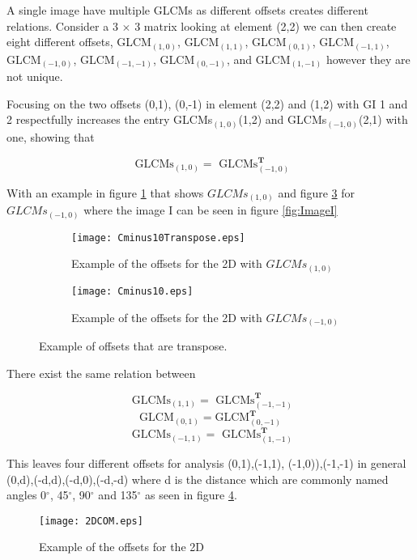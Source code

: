 A single image have multiple GLCMs as different offsets creates different relations. Consider a 3 $\times$ 3 matrix looking at element (2,2) we can then create eight different offsets, GLCM$_{(1,0)}$, GLCM$_{(1,1)}$, GLCM$_{(0,1)}$, GLCM$_{(-1,1)}$, GLCM$_{(-1,0)}$, GLCM$_{(-1,-1)}$, GLCM$_{(0,-1)}$, and GLCM$_{(1,-1)}$ however they are not unique. 

Focusing on the two offsets {(0,1), (0,-1)} in element (2,2) and (1,2) with GI 1 and 2 respectfully increases the entry GLCMs$_{(1,0)}$(1,2) and GLCMs$_{(-1,0)}$(2,1) with one, showing that 

\[
\text{ GLCMs}_{(1,0)}=\text{ GLCMs}_{(-1,0)}^\textbf{T}
\]

With an example in figure \ref{fig:Cminus10Transpose} that shows $GLCMs_{(1,0)}$ and figure \ref{fig:Cminus10Example} for $GLCMs_{(-1,0)}$ where the image I can be seen in figure \ref{fig:ImageI}

\begin{figure}[H]
\centering
    \begin{subfigure}{.45\textwidth}
      \centering
      \texttt{[image: Cminus10Transpose.eps]}
      \caption{Example of the offsets for the 2D with $GLCMs_{(1,0)}$}\label{fig:Cminus10Transpose}
    \end{subfigure}
    \begin{subfigure}{.45\textwidth}
      \centering
      \texttt{[image: Cminus10.eps]}
      \caption{Example of the offsets for the 2D with $GLCMs_{(-1,0)}$}\label{fig:Cminus10Example}
    \end{subfigure}
    \caption{Example of offsets that are transpose.}
\end{figure}

There exist the same relation between

\[
\text{ GLCMs}_{(1,1)}=\text{ GLCMs}_{(-1,-1)}^\textbf{T}
\]
\[
\text{GLCM}_{(0,1)} = \text{GLCM}_{(0,-1)}^\textbf{T}
\]
\[
\text{ GLCMs}_{(-1,1)}=\text{ GLCMs}_{(1,-1)}^\textbf{T}
\]


This leaves four different offsets for analysis {(0,1),(-1,1), (-1,0)),(-1,-1)} in general {(0,d),(-d,d),(-d,0),(-d,-d)} where d is the distance which are commonly named angles 0$^\circ$, 45$^\circ$, 90$^\circ$ and 135$^\circ$ as seen in figure \ref{2DCOM}.

\begin{figure}[H]
  \centering
  \texttt{[image: 2DCOM.eps]}
  \caption{Example of the offsets for the 2D}\label{2DCOM}
\end{figure}

